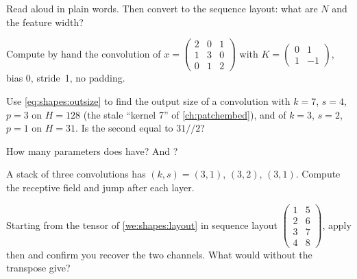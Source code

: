 \begin{checkyourself}
\item\label{ex:shapes:1} Read  aloud in plain words. Then convert
 to the sequence layout: what are $N$ and the feature width?
\item\label{ex:shapes:2} Compute by hand the convolution of
$x = \begin{pmatrix}2&0&1\\1&3&0\\0&1&2\end{pmatrix}$ with
$K = \begin{pmatrix}0&1\\1&-1\end{pmatrix}$, bias $0$, stride~1, no padding.
\item\label{ex:shapes:3} Use \cref{eq:shapes:outsize} to find the output size of a convolution with
$k=7$, $s=4$, $p=3$ on $H=128$ (the stale ``kernel 7'' of \cref{ch:patchembed}), and of $k=3$, $s=2$,
$p=1$ on $H=31$. Is the second equal to $31 /\!/ 2$?
\item\label{ex:shapes:4} How many parameters does  have? And
?
\item\label{ex:shapes:5} A stack of three convolutions has $(k,s) = (3,1)$, $(3,2)$, $(3,1)$. Compute
the receptive field and jump after each layer.
\item\label{ex:shapes:6} Starting from the tensor of \cref{we:shapes:layout} in sequence layout
$\begin{pmatrix}1&5\\2&6\\3&7\\4&8\end{pmatrix}$, apply  then
 and confirm you recover the two channels. What would
 without the transpose give?
\end{checkyourself}

